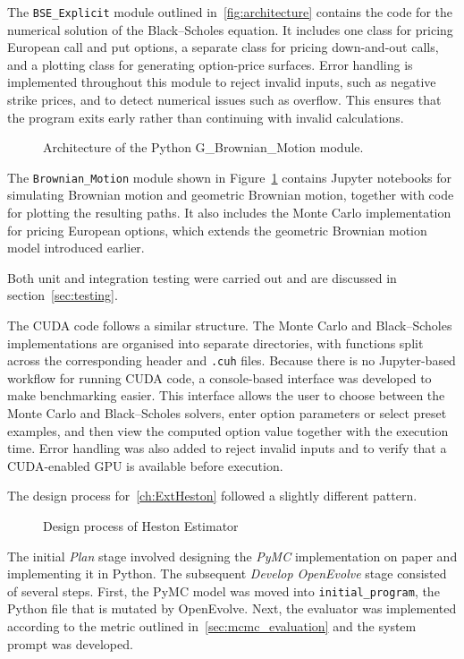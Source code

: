 \documentclass[11pt]{report}
\begin{document}
The \texttt{BSE\_Explicit} module outlined in~\ref{fig:architecture} contains the code for the numerical 
solution of the Black--Scholes equation. It includes one class for pricing 
European call and put options, a separate class for pricing down-and-out 
calls, and a plotting class for generating option-price surfaces. 
Error handling is implemented throughout this module to reject 
invalid inputs, such as negative strike prices, and to detect 
numerical issues such as overflow. This ensures that the program
exits early rather than continuing with invalid calculations.


\begin{figure}[H]
  \centering
  \resizebox{0.95\textwidth}{!}{}
  \caption{Architecture of the Python G\_Brownian\_Motion module.}
  \label{fig:bmArch}
\end{figure}

The \texttt{Brownian\_Motion} module shown in Figure~\ref{fig:bmArch} contains Jupyter 
notebooks for simulating Brownian motion and geometric Brownian motion, 
together with code for plotting the resulting paths. It also includes the 
Monte Carlo implementation for pricing European options, which extends the 
geometric Brownian motion model introduced earlier.

Both unit and integration testing were carried out and are 
discussed in section~\ref{sec:testing}.

The CUDA code follows a similar structure. 
The Monte Carlo and Black--Scholes implementations 
are organised into separate directories, with functions 
split across the corresponding header and \texttt{.cuh} files. 
Because there is no Jupyter-based workflow for running CUDA code, 
a console-based interface was developed to make benchmarking easier. 
This interface allows the user to choose between the 
Monte Carlo and Black--Scholes solvers, enter 
option parameters or select preset examples, 
and then view the computed option value together 
with the execution time. Error handling was also added to 
reject invalid inputs and to verify that a CUDA-enabled 
GPU is available before execution.


The design process for~\ref{ch:ExtHeston} followed a slightly different pattern. 
\begin{figure}[H]
    \centering
    \resizebox{0.72\textwidth}{!}{}
    \caption{Design process of Heston Estimator}
    \label{fig:hest_design}
\end{figure}
The initial \textit{Plan} stage involved designing the \textit{PyMC}
implementation on paper and implementing it in Python. 
The subsequent \textit{Develop OpenEvolve} stage consisted of several steps.
First, the PyMC model was moved into \texttt{initial\_program},
the Python file that is mutated by OpenEvolve.
Next, the evaluator was implemented according to 
the metric outlined in~\ref{sec:mcmc_evaluation} 
and the system prompt was developed.
\end{document}
